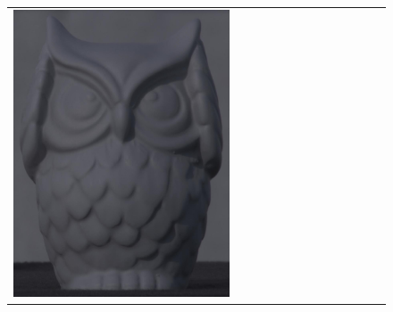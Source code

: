 \begin{figure}[!ht]
\begin{tabular}{@{}rcccccccccccc@{}}
    \includegraphics[width=\customwidth]{./figures/reconstruction/object/143215.jpg} &

\end{tabular}
\end{figure}
